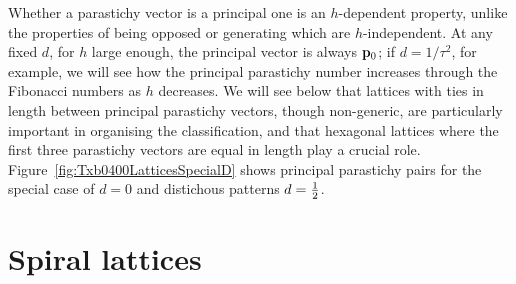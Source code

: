 Whether a parastichy vector is a principal one is an $h$-dependent property, unlike the properties of being opposed or generating which are $h$-independent. At any fixed $d$, for $h$ large enough, the principal vector is always ${\mathbf p}_{0}$; if $d=1/\tau^2$, for example, we will see  how the principal parastichy number increases through the Fibonacci numbers as $h$ decreases. We will see below that lattices with ties in length between principal parastichy vectors, though non-generic, are particularly important in organising the classification, and that hexagonal lattices where the first three parastichy vectors are equal in length play a crucial role. 
Figure~\ref{fig:Txb0400LatticesSpecialD} shows principal parastichy pairs for the special case of  $d=0$ and distichous patterns $d=\textstyle{\frac{1}{2}}$.  
\section{Spiral lattices}
\label{sec:spiral}

